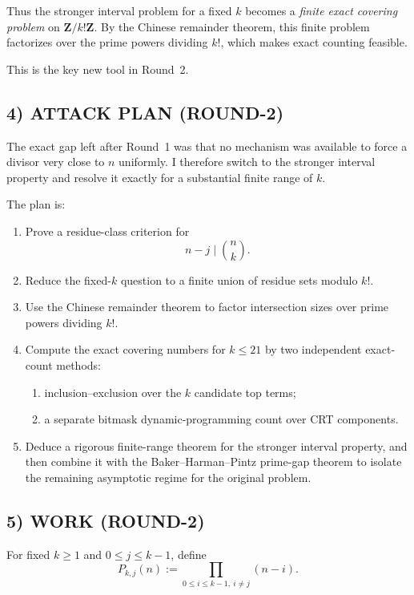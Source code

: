 Thus the stronger interval problem for a fixed \(k\) becomes a \emph{finite exact covering problem} on \(\mathbf{Z}/k!\mathbf{Z}\).  By the Chinese remainder theorem, this finite problem factorizes over the prime powers dividing \(k!\), which makes exact counting feasible.

This is the key new tool in Round~2.

\subsection*{4) ATTACK PLAN (ROUND-2)}

The exact gap left after Round~1 was that no mechanism was available to force a divisor very close to \(n\) uniformly.  I therefore switch to the stronger interval property and resolve it exactly for a substantial finite range of \(k\).

The plan is:

\begin{enumerate}
\item Prove a residue-class criterion for
\[
n-j\mid \binom{n}{k}.
\]
\item Reduce the fixed-\(k\) question to a finite union of residue sets modulo \(k!\).
\item Use the Chinese remainder theorem to factor intersection sizes over prime powers dividing \(k!\).
\item Compute the exact covering numbers for \(k\le 21\) by two independent exact-count methods:
\begin{enumerate}
\item inclusion--exclusion over the \(k\) candidate top terms;
\item a separate bitmask dynamic-programming count over CRT components.
\end{enumerate}
\item Deduce a rigorous finite-range theorem for the stronger interval property, and then combine it with the Baker--Harman--Pintz prime-gap theorem to isolate the remaining asymptotic regime for the original problem.
\end{enumerate}

\subsection*{5) WORK (ROUND-2)}

For fixed \(k\ge 1\) and \(0\le j\le k-1\), define
\[
P_{k,j}(n):=\prod_{0\le i\le k-1,\ i\ne j} (n-i).
\]

